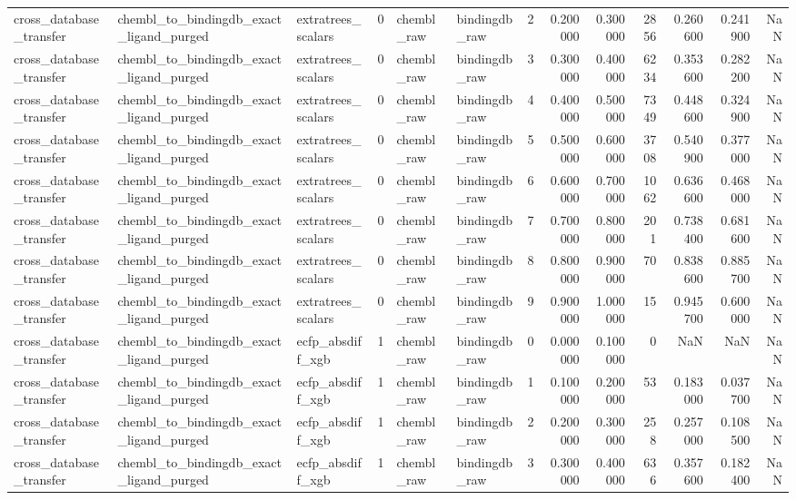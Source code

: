 \begin{longtable}{lllrllrrrrrrr}
cross\_database\_transfer & chembl\_to\_bindingdb\_exact\_ligand\_purged & extratrees\_scalars & 0 & chembl\_raw & bindingdb\_raw & 2 & 0.200000 & 0.300000 & 2856 & 0.260600 & 0.241900 & NaN \\
cross\_database\_transfer & chembl\_to\_bindingdb\_exact\_ligand\_purged & extratrees\_scalars & 0 & chembl\_raw & bindingdb\_raw & 3 & 0.300000 & 0.400000 & 6234 & 0.353600 & 0.282200 & NaN \\
cross\_database\_transfer & chembl\_to\_bindingdb\_exact\_ligand\_purged & extratrees\_scalars & 0 & chembl\_raw & bindingdb\_raw & 4 & 0.400000 & 0.500000 & 7349 & 0.448600 & 0.324900 & NaN \\
cross\_database\_transfer & chembl\_to\_bindingdb\_exact\_ligand\_purged & extratrees\_scalars & 0 & chembl\_raw & bindingdb\_raw & 5 & 0.500000 & 0.600000 & 3708 & 0.540900 & 0.377000 & NaN \\
cross\_database\_transfer & chembl\_to\_bindingdb\_exact\_ligand\_purged & extratrees\_scalars & 0 & chembl\_raw & bindingdb\_raw & 6 & 0.600000 & 0.700000 & 1062 & 0.636600 & 0.468000 & NaN \\
cross\_database\_transfer & chembl\_to\_bindingdb\_exact\_ligand\_purged & extratrees\_scalars & 0 & chembl\_raw & bindingdb\_raw & 7 & 0.700000 & 0.800000 & 201 & 0.738400 & 0.681600 & NaN \\
cross\_database\_transfer & chembl\_to\_bindingdb\_exact\_ligand\_purged & extratrees\_scalars & 0 & chembl\_raw & bindingdb\_raw & 8 & 0.800000 & 0.900000 & 70 & 0.838600 & 0.885700 & NaN \\
cross\_database\_transfer & chembl\_to\_bindingdb\_exact\_ligand\_purged & extratrees\_scalars & 0 & chembl\_raw & bindingdb\_raw & 9 & 0.900000 & 1.000000 & 15 & 0.945700 & 0.600000 & NaN \\
cross\_database\_transfer & chembl\_to\_bindingdb\_exact\_ligand\_purged & ecfp\_absdiff\_xgb & 1 & chembl\_raw & bindingdb\_raw & 0 & 0.000000 & 0.100000 & 0 & NaN & NaN & NaN \\
cross\_database\_transfer & chembl\_to\_bindingdb\_exact\_ligand\_purged & ecfp\_absdiff\_xgb & 1 & chembl\_raw & bindingdb\_raw & 1 & 0.100000 & 0.200000 & 53 & 0.183000 & 0.037700 & NaN \\
cross\_database\_transfer & chembl\_to\_bindingdb\_exact\_ligand\_purged & ecfp\_absdiff\_xgb & 1 & chembl\_raw & bindingdb\_raw & 2 & 0.200000 & 0.300000 & 258 & 0.257000 & 0.108500 & NaN \\
cross\_database\_transfer & chembl\_to\_bindingdb\_exact\_ligand\_purged & ecfp\_absdiff\_xgb & 1 & chembl\_raw & bindingdb\_raw & 3 & 0.300000 & 0.400000 & 636 & 0.357600 & 0.182400 & NaN \\

\end{longtable}
